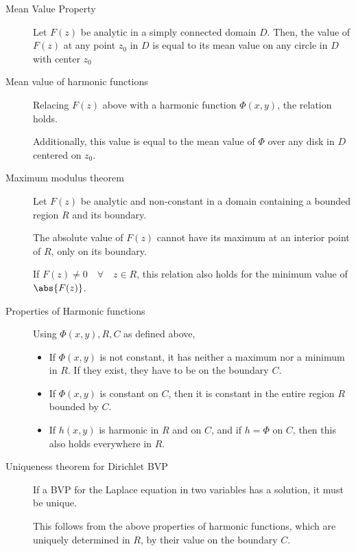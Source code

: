 \begin{description}
    \item[Mean Value Property] Let $ F(z) $ be analytic in a simply connected domain
        $ D $. Then, the value of $ F(z) $ at any point $ z_0 $ in $ D $ is equal to its
        mean value on any circle in $ D $ with center $ z_0 $

    \item[Mean value of harmonic functions] Relacing $ F(z) $ above with a harmonic
        function $ \Phi(x,y) $, the relation holds. \par
        Additionally, this value is equal to the mean value of $ \Phi $ over any disk
        in $ D $ centered on $ z_0 $.

    \item[Maximum modulus theorem] Let $ F(z) $ be analytic and non-constant in a domain
        containing a bounded region $ R $ and its boundary. \par
        The absolute value of $ F(z) $ cannot have its maximum at an interior point of
        $ R $, only on its boundary. \par
        If $ F(z) \neq 0 \quad \forall \quad z \in R $, this relation also holds for the
        minimum value of $ \abs{F(z)} $.

    \item[Properties of Harmonic functions] Using $ \Phi(x,y), R, C $ as defined
        above,
        \begin{itemize}
            \item If $ \Phi(x, y) $ is not constant, it has neither a maximum nor a
                  minimum in $ R $. If they exist, they have to be on the boundary $ C $.
            \item If $ \Phi(x,y) $ is constant on $ C $, then it is constant in
                  the entire region $ R $ bounded by $ C $.
            \item If $ h(x, y) $ is harmonic in $ R $ and on $ C $, and if
                  $ h = \Phi $ on $ C $, then this also holds everywhere in $ R $.
        \end{itemize}

    \item[Uniqueness theorem for Dirichlet BVP] If a BVP for the Laplace equation in
        two variables has a solution, it must be unique. \par
        This follows from the above properties of harmonic functions, which are uniquely
        determined in $ R $, by their value on the boundary $ C $.
\end{description}